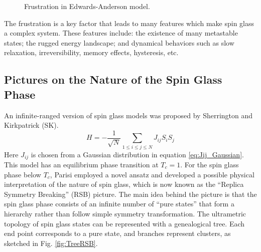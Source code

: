 \begin{figure}
  \centering
  \hspace{0.5cm}
  \caption{Frustration in Edwards-Anderson model.}
  \label{fig:frustration}
\end{figure}

The frustration is a key factor that leads to many features which make 
spin glass a complex system.
These features include: the existence of many metastable states; the rugged energy 
landscape; and dynamical behaviors such as slow relaxation, irreversibility, 
memory effects, hysteresis, etc. 


\subsection{Pictures on the Nature of the Spin Glass Phase}
\label{sec:meanfield-model}

An infinite-ranged version of spin glass models 
was proposed by Sherrington and Kirkpatrick (SK).
\begin{equation}
  \label{eq:SK}
  H=-\frac{1}{\sqrt{N}}\sum_{1\le i\le j\le N}J_{ij}S_iS_j
\end{equation}
Here $J_{ij}$ is chosen from a Gaussian distribution in equation 
\ref{eq:Jij_Gaussian}.
This model has an equilibrium phase transition at $T_c = 1$.
For the spin glass phase below $T_c$, Parisi employed a novel ansatz and 
developed a  possible physical interpretation of the nature of spin glass, 
which is now known as the ``Replica Symmetry Breaking'' (RSB) picture. The main
idea behind the picture is that the spin glass phase consists of an infinite 
number of ``pure states'' that form a hierarchy rather than follow simple symmetry
transformation. 
The ultrametric topology of spin glass states can be represented with a 
genealogical tree. Each end point corresponds to a pure state, and branches 
represent clusters, as sketched in Fig. \ref{fig:TreeRSB}. 

